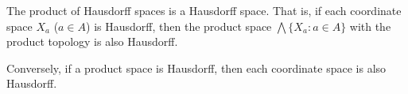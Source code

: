 The product of Hausdorff spaces is a Hausdorff space. That is, if each coordinate space $X_a$ ($a \in A$) is Hausdorff, then the product space $\bigwedge \{X_a : a \in A\}$ with the product topology is also Hausdorff.

Conversely, if a product space is Hausdorff, then each coordinate space is also Hausdorff.
